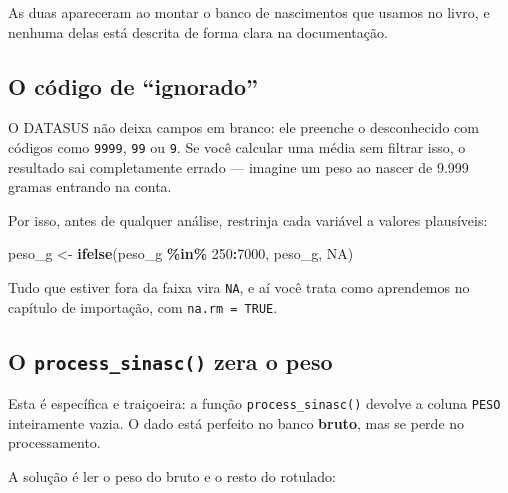 \documentclass[
]{book}
\newenvironment{Shaded}{\begin{snugshade}}{\end{snugshade}}
\newcommand{\CommentTok}[1]{\textcolor[rgb]{0.56,0.35,0.01}{\textit{#1}}}
\newcommand{\ConstantTok}[1]{\textcolor[rgb]{0.56,0.35,0.01}{#1}}
\newcommand{\DecValTok}[1]{\textcolor[rgb]{0.00,0.00,0.81}{#1}}
\newcommand{\FunctionTok}[1]{\textcolor[rgb]{0.13,0.29,0.53}{\textbf{#1}}}
\newcommand{\NormalTok}[1]{#1}
\newcommand{\OtherTok}[1]{\textcolor[rgb]{0.56,0.35,0.01}{#1}}
\newcommand{\SpecialCharTok}[1]{\textcolor[rgb]{0.81,0.36,0.00}{\textbf{#1}}}
\begin{document}
As duas apareceram ao montar o banco de nascimentos que usamos no livro, e nenhuma delas está descrita de forma clara na documentação.

\subsection{O código de ``ignorado''}\label{o-cuxf3digo-de-ignorado}

O DATASUS não deixa campos em branco: ele preenche o desconhecido com códigos como \texttt{9999}, \texttt{99} ou \texttt{9}. Se você calcular uma média sem filtrar isso, o resultado sai completamente errado --- imagine um peso ao nascer de 9.999 gramas entrando na conta.

Por isso, antes de qualquer análise, restrinja cada variável a valores plausíveis:

\begin{Shaded}
\begin{Highlighting}[]
\NormalTok{peso\_g }\OtherTok{\textless{}{-}} \FunctionTok{ifelse}\NormalTok{(peso\_g }\SpecialCharTok{\%in\%} \DecValTok{250}\SpecialCharTok{:}\DecValTok{7000}\NormalTok{, peso\_g, }\ConstantTok{NA}\NormalTok{)}
\end{Highlighting}
\end{Shaded}

Tudo que estiver fora da faixa vira \texttt{NA}, e aí você trata como aprendemos no capítulo de importação, com \texttt{na.rm\ =\ TRUE}.

\subsection{\texorpdfstring{O \texttt{process\_sinasc()} zera o peso}{O process\_sinasc() zera o peso}}\label{o-process_sinasc-zera-o-peso}

Esta é específica e traiçoeira: a função \texttt{process\_sinasc()} devolve a coluna \texttt{PESO} inteiramente vazia. O dado está perfeito no banco \textbf{bruto}, mas se perde no processamento.

A solução é ler o peso do bruto e o resto do rotulado:

\begin{Shaded}
\end{Shaded}
\end{document}

